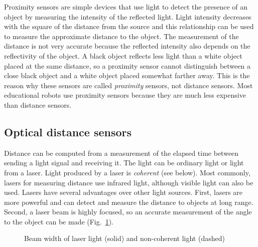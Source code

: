 Proximity sensors are simple devices that use light to detect the presence of an object by measuring the intensity of the reflected light. Light intensity decreases with the square of the distance from the source and this relationship can be used to measure the approximate distance to the object. The measurement of the distance is not very accurate because the reflected intensity also depends on the reflectivity of the object. A black object reflects less light than a white object placed at the same distance, so a proximity sensor cannot distinguish between a close black object and a white object placed somewhat farther away. This is the reason why these sensors are called \emph{proximity} sensors, not distance sensors. Most educational robots use proximity sensors because they are much less expensive than distance sensors.

\subsection{Optical distance sensors}\label{s.optical-distance}

Distance can be computed from a measurement of the elapsed time between sending a light signal and receiving it. The light can be ordinary light or light from a laser. Light produced by a laser is \emph{coherent} (see below).  Most commonly, lasers for measuring distance use infrared light, although visible light can also be used. Lasers have several advantages over other light sources. First, lasers are more powerful and can detect and measure the distance to objects at long range. Second, a laser beam is highly focused, so an accurate measurement of the angle to the object can be made (Fig.~\ref{fig.beam}).

\begin{figure}
\begin{center}
\end{center}
\caption{Beam width of laser light (solid) and non-coherent light (dashed)}\label{fig.beam}
\end{figure}

